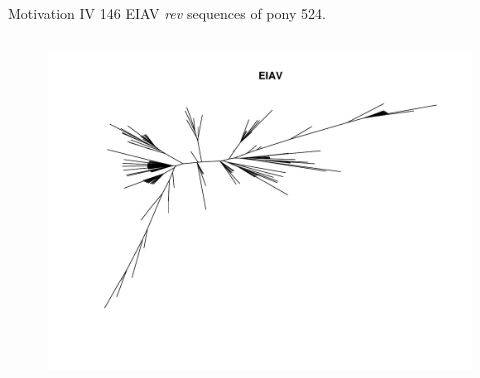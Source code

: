 \documentclass{beamer}
\begin{document}

\begin{frame}{Motivation IV}
146 EIAV {\it rev} sequences of pony 524.

\vspace{-0.2cm}

\begin{columns}
\begin{column}{0.8\textwidth}
  \begin{figure}
  \includegraphics[width=\textwidth]{./graph/eiav_nj}
  \end{figure}
\end{column}

\hspace{-1.0cm}


\end{columns}
\end{frame}
\end{document}
